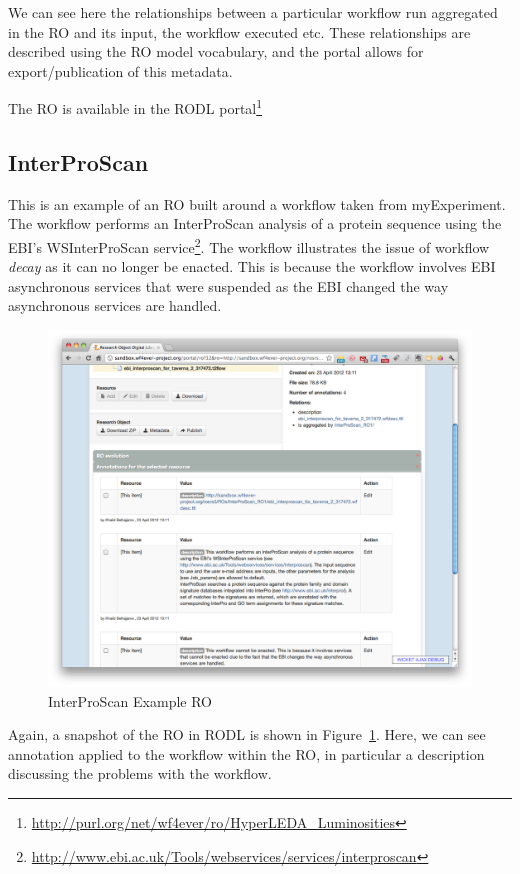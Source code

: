 We can see here the relationships between a particular workflow run
aggregated in the RO and its input, the workflow executed etc. These
relationships are described using the RO model vocabulary, and the
portal allows for export/publication of this metadata. 

The RO is available in the RODL
portal\footnote{\url{http://purl.org/net/wf4ever/ro/HyperLEDA_Luminosities}}

\subsection{InterProScan}

This is an example of an RO built around a workflow taken from
myExperiment. The workflow performs an InterProScan analysis of a
protein sequence using the EBI's WSInterProScan service\footnote{\url{
http://www.ebi.ac.uk/Tools/webservices/services/interproscan}}. The
workflow illustrates the issue of workflow \emph{decay} as it can no
longer be enacted. This is because the workflow involves EBI
asynchronous services that were suspended as the EBI changed the way
asynchronous services are handled. 

\begin{figure}[ht]
  \centering
  \includegraphics[width=\picwidth]{Figures/interpro}
  \caption{InterProScan Example RO}
  \label{fig:interpro}
\end{figure}

Again, a snapshot of the RO in RODL is shown in
Figure~\ref{fig:interpro}. Here, we can see annotation applied to the
workflow within the RO, in particular a description discussing the
problems with the workflow. 

